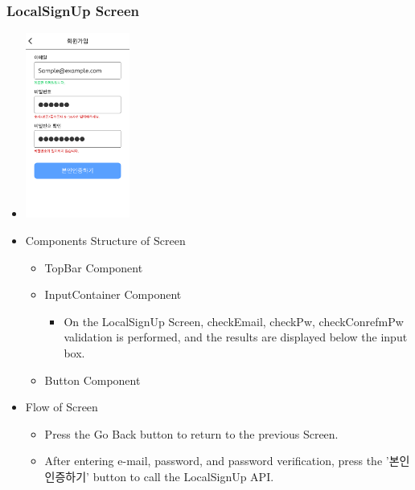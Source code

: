 \documentclass[conference]{IEEEtran}
\begin{document}
\subsubsection{LocalSignUp Screen}
\begin{itemize}
    \item[] \includegraphics[width=0.27\textwidth]{img/D/3.png}
    \item Components Structure of Screen
    \begin{itemize}
        \item TopBar Component
        \item InputContainer Component
        \begin{itemize}
            \item On the LocalSignUp Screen, checkEmail, checkPw, checkConrefmPw validation is performed, and the results are displayed below the input box.
        \end{itemize}
        \item Button Component
    \end{itemize}
    \item Flow of Screen
    \begin{itemize}
        \item Press the Go Back button to return to the previous Screen.
        \item After entering e-mail, password, and password verification, press the '본인인증하기' button to call the LocalSignUp API.
        \\
    \end{itemize}
\end{itemize}
\newpage
\end{document}
